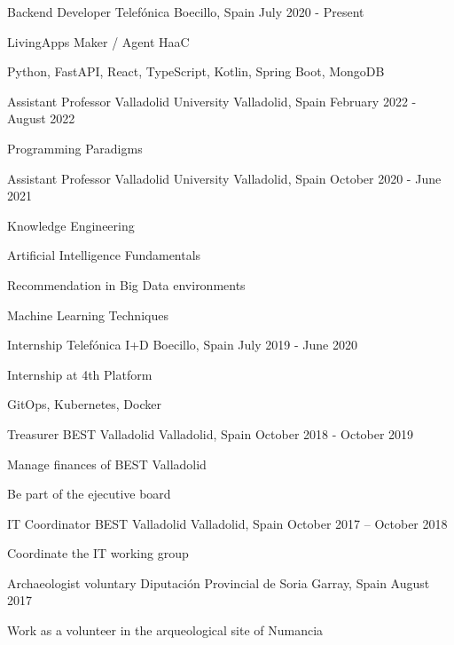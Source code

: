 \documentclass[]{awesome-cv}
\begin{document}
\vspace{-2mm}
\begin{cventries}
	\cventry
	{Backend Developer}
	{Telefónica}
	{Boecillo, Spain}
	{July 2020 - Present}
	{\begin{cvitems}
		\item {LivingApps Maker / Agent HaaC}
		\item {Python, FastAPI, React, TypeScript, Kotlin, Spring Boot, MongoDB}
	\end{cvitems}}
	\cventry
	{Assistant Professor}
	{Valladolid University}
	{Valladolid, Spain}
	{February 2022 - August 2022}
	{\begin{cvitems}
		\item {Programming Paradigms}
	\end{cvitems}}
	\cventry
	{Assistant Professor}
	{Valladolid University}
	{Valladolid, Spain}
	{October 2020 - June 2021}
	{\begin{cvitems}
		\item {Knowledge Engineering}
		\item {Artificial Intelligence Fundamentals}
		\item {Recommendation in Big Data environments}
		\item {Machine Learning Techniques}
	\end{cvitems}}        
	\cventry
	{Internship}
	{Telefónica I+D}
	{Boecillo, Spain}
	{July 2019 - June 2020}
	{\begin{cvitems}
		\item {Internship at 4th Platform}
		\item {GitOps, Kubernetes, Docker}
	\end{cvitems}
	}
	\cventry
	{Treasurer}
	{BEST Valladolid}
	{Valladolid, Spain}
	{October 2018 - October 2019}
	{\begin{cvitems}
		\item {Manage finances of BEST Valladolid}
		\item {Be part of the ejecutive board}
		\end{cvitems}}
	\cventry
	{IT Coordinator}
	{BEST Valladolid}
	{Valladolid, Spain}
	{October 2017 – October 2018}
	{\begin{cvitems}
		\item {Coordinate the IT working group}
		\end{cvitems}}
	\cventry
	{Archaeologist voluntary}
	{Diputación Provincial de Soria}
	{Garray, Spain}
	{August 2017}
	{\begin{cvitems}
		\item {Work as a volunteer in the arqueological site of Numancia}
		\end{cvitems}}
\end{cventries}
\end{document}
